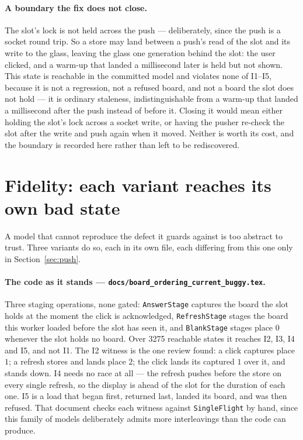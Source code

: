 \documentclass[a4paper,10pt,fleqn]{article}
\begin{document}
\paragraph{A boundary the fix does not close.}
The slot's lock is not held across the push --- deliberately, since the push is a
socket round trip. So a store may land between a push's read of the slot and its
write to the glass, leaving the glass one generation behind the slot: the user
clicked, and a warm-up that landed a millisecond later is held but not shown.
This state is reachable in the committed model and violates none of I1--I5,
because it is not a regression, not a refused board, and not a board the slot
does not hold --- it is ordinary staleness, indistinguishable from a warm-up
that landed a millisecond after the push instead of before it. Closing it would
mean either holding the slot's lock across a socket write, or having the pusher
re-check the slot after the write and push again when it moved. Neither is worth
its cost, and the boundary is recorded here rather than left to be rediscovered.

\section{Fidelity: each variant reaches its own bad state}
\label{sec:fidelity}

A model that cannot reproduce the defect it guards against is too abstract to
trust. Three variants do so, each in its own file, each differing from this one
only in Section~\ref{sec:push}.

\paragraph{The code as it stands ---
\texttt{docs/board\_ordering\_current\_buggy.tex}.}
Three staging operations, none gated: \texttt{AnswerStage} captures the board
the slot holds at the moment the click is acknowledged, \texttt{RefreshStage}
stages the board this worker loaded before the slot has seen it, and
\texttt{BlankStage} stages place $0$ whenever the slot holds no board. Over 3275
reachable states it reaches I2, I3, I4 and I5, and not I1. The I2 witness is the
one review found: a click captures place $1$; a refresh stores and lands place
$2$; the click lands its captured $1$ over it, and stands down. I4 needs no race
at all --- the refresh pushes before the store on every single refresh, so the
display is ahead of the slot for the duration of each one. I5 is a load that
began first, returned last, landed its board, and was then refused. That
document checks each witness against \texttt{SingleFlight} by hand, since this
family of models deliberately admits more interleavings than the code can
produce.
\end{document}
